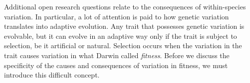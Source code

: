 Additional open research questions relate to the consequences of within-species variation. In particular, a lot of attention is paid to how genetic variation translates into adaptive evolution.
Any trait that possesses genetic variation is evolvable, but it can evolve in an adaptive way only if the trait is subject to selection, be it artificial or natural. Selection occurs when the variation in the trait causes variation in what Darwin called \emph{fitness}. Before we discuss the specificity of the causes and consequences of variation in fitness, we must introduce this difficult concept.



